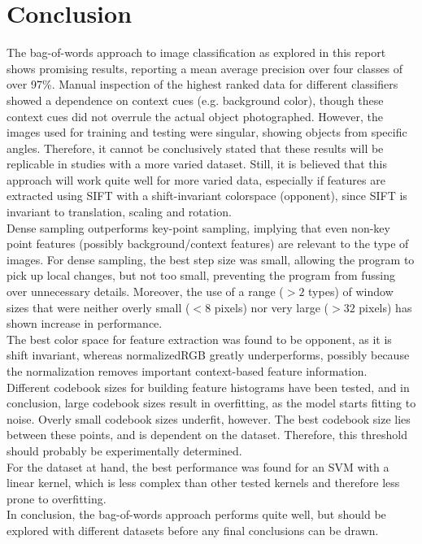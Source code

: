 \documentclass{article} %
\begin{document}
\section{Conclusion}
The bag-of-words approach to image classification as explored in this report shows promising results, reporting a mean average precision over four classes of over 97\%. Manual inspection of the highest ranked data for different classifiers showed a dependence on context cues (e.g. background color), though these context cues did not overrule the actual object photographed. However, the images used for training and testing were singular, showing objects from specific angles. Therefore, it cannot be conclusively stated that these results will be replicable in studies with a more varied dataset. Still, it is believed that this approach will work quite well for more varied data, especially if features are extracted using SIFT with a shift-invariant colorspace (opponent), since SIFT is invariant to translation, scaling and rotation. \\
Dense sampling outperforms key-point sampling, implying that even non-key point features (possibly background/context features) are relevant to the type of images. For dense sampling, the best step size was small, allowing the program to pick up local changes, but not too small, preventing the program from fussing over unnecessary details. Moreover, the use of a range ($>2$ types) of window sizes that were neither overly small ($<$8 pixels) nor very large ($>32$ pixels) has shown increase in performance. \\
The best color space for feature extraction was found to be opponent, as it is shift invariant, whereas normalizedRGB greatly underperforms, possibly because the normalization removes important context-based feature information. \\
Different codebook sizes for building feature histograms have been tested, and in conclusion, large codebook sizes result in overfitting, as the model starts fitting to noise. Overly small codebook sizes underfit, however. The best codebook size lies between these points, and is dependent on the dataset. Therefore, this threshold should probably be experimentally determined. \\
For the dataset at hand, the best performance was found for an SVM with a linear kernel, which is less complex than other tested kernels and therefore less prone to overfitting. \\
In conclusion, the bag-of-words approach performs quite well, but should be explored with different datasets before any final conclusions can be drawn.
\end{document}
